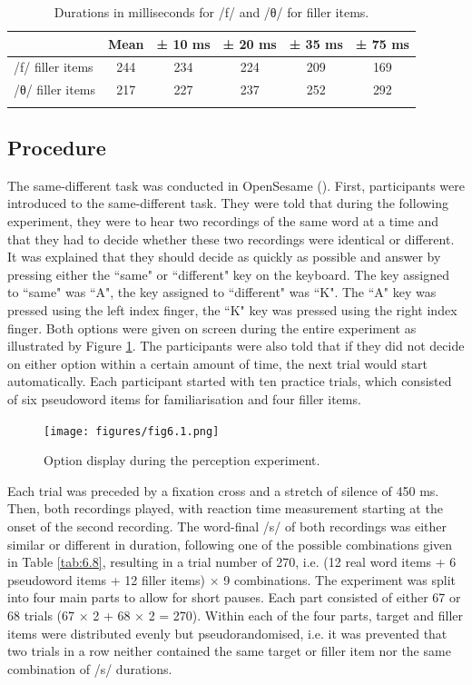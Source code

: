 \begin{table}\fontsize{10}{11}
\caption{Durations in milliseconds for /f/ and /θ/ for filler items.}
\label{tab:6.7}
\centering
\begin{tabular}{lccccc} 
\lsptoprule
~             & Mean & ± 10 ms & ± 20 ms & ± 35 ms & ± 75 ms  \\ 
\midrule
/f/ filler items & 244  & 234     & 224     & 209     & 169      \\
/θ/ filler items & 217  & 227     & 237     & 252     & 292      \\
\lspbottomrule
\end{tabular}
\end{table}

\subsection{Procedure}\label{section06_1_3}

The same-different task was conducted in OpenSesame (\cite{Mathot2012}). First, participants were introduced to the same-different task. They were told that during the following experiment, they were to hear two recordings of the same word at a time and that they had to decide whether these two recordings were identical or different. It was explained that they should decide as quickly as possible and answer by pressing either the ``same" or ``different" key on the keyboard. The key assigned to ``same" was ``A", the key assigned to ``different" was ``K". The ``A" key was pressed using the left index finger, the ``K" key was pressed using the right index finger. Both options were given on screen during the entire experiment as illustrated by Figure \ref{fig:6_1}. The participants were also told that if they did not decide on either option within a certain amount of time, the next trial would start automatically. Each participant started with ten practice trials, which consisted of six pseudoword items for familiarisation and four filler items.

\begin{figure}
    \centering
    \texttt{[image: figures/fig6.1.png]}
    \caption{Option display during the perception experiment.}
    \label{fig:6_1}
\end{figure}

Each trial was preceded by a fixation cross and a stretch of silence of 450 ms. Then, both recordings played, with reaction time measurement starting at the onset of the second recording. The word-final /s/ of both recordings was either similar or different in duration, following one of the possible combinations given in Table \ref{tab:6.8}, resulting in a trial number of 270, i.e. (12 real word items + 6 pseudoword items + 12 filler items) × 9 combinations. The experiment was split into four main parts to allow for short pauses. Each part consisted of either 67 or 68 trials 
(67 × 2 + 68 × 2 = 270). Within each of the four parts, target and filler items were distributed evenly but pseudorandomised, i.e. it was prevented that two trials in a row neither contained the same target or filler item nor the same combination of /s/ durations.

